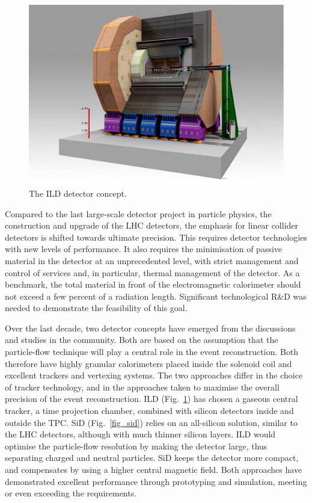\documentclass[%
 reprint,
 amsmath,amssymb,
 aps,
]{revtex4-1}
\def\Fig#1{Fig.~\ref{#1}}
\begin{document}
\begin{figure}[tb]
 \begin{center}
 \includegraphics[width=0.9\hsize]{figures/ILD.pdf}
\caption{The ILD detector concept.
\label{fig_ild}}
 \end{center}
 \vspace{-0.7cm}
 \end{figure}
 

Compared to the last large-scale detector project in particle physics,
the construction and upgrade of the LHC detectors, the 
emphasis for linear collider detectors
 is shifted towards ultimate precision. This requires detector technologies
with new levels of performance.  It also requires the  minimisation of
passive material in the detector at an unprecedented level, with strict
management and control of services and, in particular,
thermal management of the detector.  As a benchmark,  the total
material in front of the electromagnetic calorimeter should not exceed
a few percent of a radiation length. Significant technological R\&D was needed to
demonstrate the feasibility of this goal. 



Over the last decade, two detector concepts have emerged from the
discussions and studies in the community. Both are based on the assumption that
the 
particle-flow technique will  play a central role in the event
reconstruction. Both therefore have highly granular calorimeters
placed inside the solenoid coil
and excellent trackers and vertexing systems. The two approaches
differ in the choice of tracker technology, and in the approaches taken
to maximise the overall precision of the event reconstruction. ILD
(\Fig{fig_ild}) has chosen a gaseous central tracker, a time
projection chamber, combined with silicon detectors inside and outside
the TPC. SiD (\Fig{fig_sid}) relies on an all-silicon solution,
similar to the
 LHC detectors, although with
much thinner silicon layers. ILD would optimise the particle-flow
resolution by making the detector large, thus separating charged and
neutral particles. SiD keeps the detector more compact, and
compensates by using a higher central magnetic field. Both approaches
have demonstrated excellent performance through prototyping
 and simulation, meeting or even exceeding the requirements. 
\end{document}
